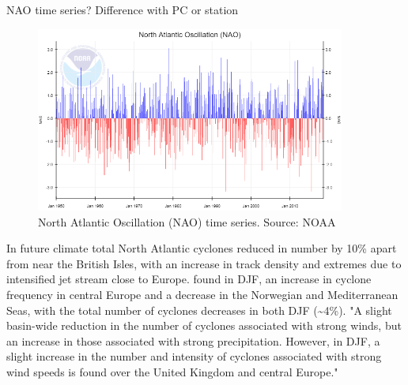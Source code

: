 NAO time series? Difference with PC or station

\begin{figure}[h]
	\centering
	\noindent\includegraphics[width=24pc,angle=0]{NAO_TS_NOAA.png}
	\caption{North Atlantic Oscillation (NAO) time series. Source: NOAA }\label{fig:NAO_TS_NOAA}
\end{figure}





In \citet{pinto2009factors} future climate total North Atlantic cyclones reduced in number by 10\% apart from near the British Isles, with an increase in track density and extremes due to intensified jet stream close to Europe. \citet{zappa2013multimodel} found in DJF, an increase in cyclone frequency in central Europe and a decrease in the Norwegian and Mediterranean Seas, with the total number of cyclones decreases in both DJF (\textasciitilde{4}\%). "A slight basin-wide reduction in the number of cyclones associated with strong winds, but an increase in those associated with strong precipitation. However, in DJF, a slight increase in the number and intensity of cyclones associated with strong wind speeds is found over the United Kingdom and central Europe."


